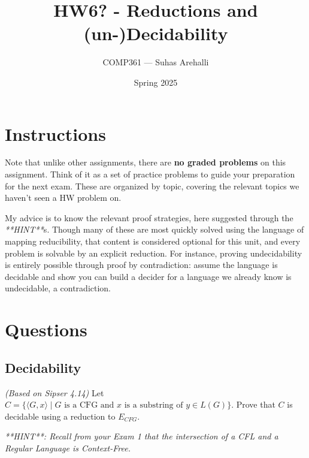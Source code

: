\documentclass{exam}
\title{HW6? - Reductions and (un-)Decidability}
\author{COMP361 --- Suhas Arehalli}
\date{Spring 2025}
\theoremstyle{definition}
\begin{document}
\maketitle

\section*{Instructions}
Note that unlike other assignments, there are \textbf{no graded problems} on this assignment. Think of it as a set of practice problems to guide your preparation for the next exam. These are organized by topic, covering the relevant topics we haven't seen a HW problem on.

My advice is to know the relevant proof strategies, here suggested through the \textit{**HINT**}s. Though many of these are most quickly solved using the language of mapping reducibility, that content is considered optional for this unit, and every problem is solvable by an explicit reduction. For instance, proving undecidability is entirely possible through proof by contradiction: assume the language is decidable and show you can build a decider for a language we already know is undecidable, a contradiction. 

\section*{Questions}

\subsection*{Decidability}
\begin{questions}
    \question \textit{(Based on Sipser 4.14)} Let $C = \{\langle G, x \rangle \mid G \text{ is a CFG and } x \text{ is a substring of } y \in L(G) \}$. Prove that $C$ is decidable using a reduction to $E_{CFG}$.

    \textit{**HINT**: Recall from your Exam 1 that the intersection of a CFL and a Regular Language is Context-Free.}
\end{questions}
\end{document}
